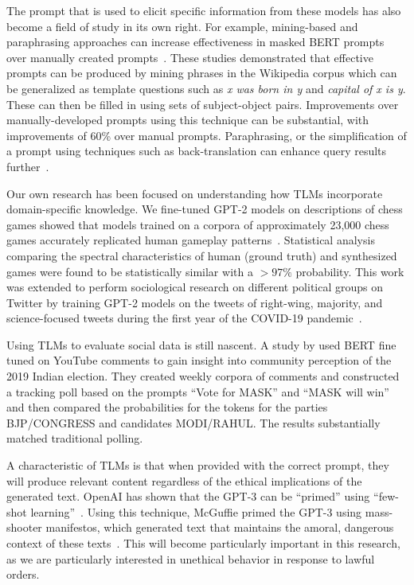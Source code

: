 \documentclass[11pt,dvipdfm]{article}
\begin{document}
The prompt that is used to elicit specific information from these models has also become a field of study in its own right. For example,  mining-based and paraphrasing approaches can increase effectiveness in masked BERT prompts over manually created prompts~\cite{jiang2020can}. These studies demonstrated that effective prompts can be produced by  mining phrases in the Wikipedia corpus which can be generalized as template questions such as \textit{x was born in y} and \textit{capital of x is y}. These can then be filled in using sets of subject-object pairs. Improvements over manually-developed prompts using this technique can be substantial, with improvements of 60\% over manual prompts. Paraphrasing, or the simplification of a prompt using techniques such as back-translation can enhance query results further~\cite{jiang2020can}. 

Our own research has been focused on understanding how TLMs incorporate domain-specific knowledge. We fine-tuned GPT-2 models on descriptions of chess games showed that models trained on a corpora of approximately 23,000 chess games accurately replicated human gameplay patterns~\cite{feldman2020navigating}. Statistical analysis comparing the spectral characteristics of human (ground truth) and synthesized games were found to be statistically similar with a $> 97\%$ probability. This work was extended to perform sociological research on different political groups on Twitter by training GPT-2 models on the tweets of right-wing, majority, and science-focused tweets during the first year of the COVID-19 pandemic~\cite{feldman2021analyzing}. 

Using TLMs to evaluate social data is still nascent. A study by \cite{palakodety122020mining} used BERT fine tuned on YouTube comments to gain insight into community perception of the 2019 Indian election. They created weekly corpora of comments and constructed a tracking poll based on the prompts \enquote{Vote for MASK} and \enquote{MASK will win} and then compared the probabilities for the tokens for the parties BJP/CONGRESS and candidates MODI/RAHUL. The results substantially matched traditional polling.

A characteristic of TLMs is that when provided with the correct prompt, they will produce relevant content regardless of the ethical implications of the generated text.   OpenAI has shown that the GPT-3 can be \enquote{primed} using \enquote{few-shot learning}~\cite{brown2020language}. Using this technique, McGuffie primed the GPT-3 using mass-shooter manifestos, which generated text that maintains the amoral, dangerous context of these texts~\cite{mcguffie2020radicalization}. This will become particularly important in this research, as we are particularly interested in unethical behavior in response to lawful orders.
\end{document}
